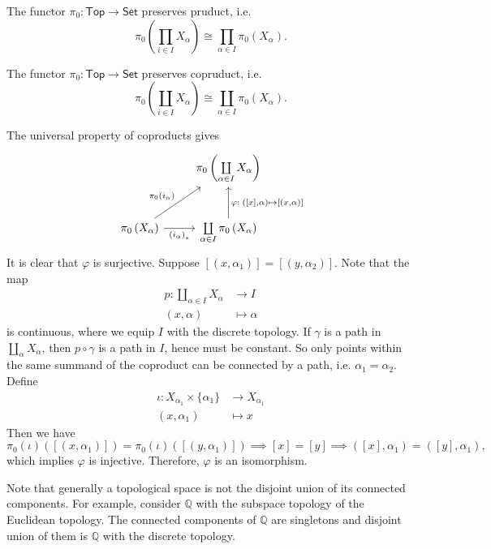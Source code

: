 \documentclass{report}
\begin{document}
\begin{proposition}{}{}
	The functor $\pi_0:\mathsf{Top}\to \mathsf{Set}$ preserves pruduct, i.e. $$
	\pi_0\left(\prod_{i\in I} X_\alpha\right)\cong\prod_{\alpha\in I} \pi_0\left(X_\alpha\right).
	$$
\end{proposition}

\begin{proposition}{}{}
	The functor $\pi_0:\mathsf{Top}\to \mathsf{Set}$ preserves copruduct, i.e. $$
	\pi_0\left(\coprod_{i\in I} X_\alpha\right)\cong\coprod_{\alpha\in I} \pi_0\left(X_\alpha\right).
	$$
\end{proposition}

\begin{prf}
	The universal property of coproducts gives
	\[
		\begin{tikzcd}[ampersand replacement=\&]
			\& \pi_0\left(\coprod\limits_{\alpha\in I} X_\alpha\right) \\ [10pt]
			\pi_0\left(X_\alpha\right) \arrow[ru, "\pi_0\left(i_\alpha\right)"] \arrow[r, "\left(i_\alpha \right)_{*}"']
			\& \coprod\limits_{\alpha\in I} \pi_0\left(X_\alpha\right)
			\arrow[u, "\varphi:\;\left({[x],}\alpha\right)\mapsto{[(x,\alpha)]}"'] 
		\end{tikzcd}			
	\]
	It is clear that $\varphi$ is surjective. Suppose $[(x,\alpha_1)]=[(y,\alpha_2)]$. Note that the map
	\begin{align*}
		p: \coprod_{\alpha\in I} X_\alpha& \longrightarrow I\\
		(x, \alpha) &\longmapsto \alpha
	\end{align*}
	is continuous, where we equip $I$ with the discrete topology. If $\gamma$ is a path in $\coprod_\alpha X_\alpha$, then $p\circ\gamma$ is a path in $I$, hence must be constant. So only points within the same summand of the coproduct can be connected by a path, i.e. $\alpha_1=\alpha_2$. Define
	\begin{align*}
		\iota: X_{\alpha_1} \times\{\alpha_1\}&\longrightarrow  X_{\alpha_1}\\
		(x, \alpha_1) &\longmapsto x
	\end{align*}
	Then we have
	\[
		\pi_0(\iota)\left([(x,\alpha_1)]\right)=\pi_0(\iota)\left([(y,\alpha_1)]\right)\implies [x]=[y]\implies ([x],\alpha_1)=([y],\alpha_1),
	\]
	which implies $\varphi$ is injective. Therefore, $\varphi$ is an isomorphism.
\end{prf}

Note that generally a topological space is not the disjoint union of its connected components. For example, consider $\mathbb{Q}$ with the subspace topology of the Euclidean topology. The connected components of $\mathbb{Q}$ are singletons and disjoint union of them is $\mathbb{Q}$ with the discrete topology.
\end{document}
